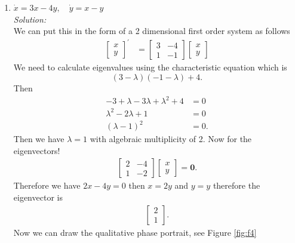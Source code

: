 \documentclass[10pt]{amsart}
\theoremstyle{nonumberplain}
\begin{document}
\begin{enumerate}[label={\bf {\arabic*}:}]
\begin{enumerate}
\item $\dot x = 3x - 4y, \quad \dot y = x - y$ \\
\textit{Solution:} \\
We can put this in the form of a 2 dimensional first order system as follows
\begin{align*}
\begin{bmatrix}
x \\ y
\end{bmatrix}^\prime
&= \begin{bmatrix}
3 & -4 \\
1 & -1
\end{bmatrix} \begin{bmatrix}
x \\ y
\end{bmatrix}
\end{align*}
We need to calculate eigenvalues using the characteristic equation which is 
$$(3 - \lambda)(-1 -\lambda) + 4.$$
Then
\begin{align*}
-3 + \lambda -3\lambda + \lambda^2 + 4 &= 0 \\
\lambda^2 -2\lambda + 1 &= 0 \\
(\lambda - 1)^2 &= 0.
\end{align*}
Then we have $\lambda = 1$ with algebraic multiplicity of 2.
Now for the eigenvectors!
\begin{align*}
\begin{bmatrix}
2 & -4 \\
1 & -2
\end{bmatrix} \begin{bmatrix}
x \\ y
\end{bmatrix} = \bm 0.
\end{align*}
Therefore we have $2x -4y = 0$ then $x = 2y$ and $y = y$ therefore the eigenvector is
\begin{align*}
\begin{bmatrix} 2 \\ 1 \end{bmatrix}.
\end{align*} 
Now we can draw the qualitative phase portrait, see Figure \ref{fig:f4} \\


\end{enumerate}
\end{enumerate}
\end{document}
